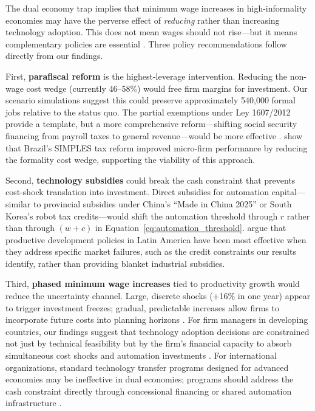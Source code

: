 \documentclass[5p,times,authoryear]{elsarticle}
\begin{document}
The dual economy trap implies that minimum wage increases in high-informality economies may have the perverse effect of \emph{reducing} rather than increasing technology adoption. This does not mean wages should not rise---but it means complementary policies are essential \citep{worldbank2019wdr, ilo2024outlook}. Three policy recommendations follow directly from our findings.

First, \textbf{parafiscal reform} is the highest-leverage intervention. Reducing the non-wage cost wedge (currently 46--58\%) would free firm margins for investment. Our scenario simulations suggest this could preserve approximately 540,000 formal jobs relative to the status quo. The partial exemptions under Ley 1607/2012 provide a template, but a more comprehensive reform---shifting social security financing from payroll taxes to general revenue---would be more effective \citep{levy2008good, pages2010age}. \citet{fajnzylber2011formality} show that Brazil's SIMPLES tax reform improved micro-firm performance by reducing the formality cost wedge, supporting the viability of this approach.

Second, \textbf{technology subsidies} could break the cash constraint that prevents cost-shock translation into investment. Direct subsidies for automation capital---similar to provincial subsidies under China's ``Made in China 2025'' or South Korea's robot tax credits---would shift the automation threshold through $r$ rather than through $(w + c)$ in Equation~\ref{eq:automation_threshold}. \citet{crespi2014rethinking} argue that productive development policies in Latin America have been most effective when they address specific market failures, such as the credit constraints our results identify, rather than providing blanket industrial subsidies.

Third, \textbf{phased minimum wage increases} tied to productivity growth would reduce the uncertainty channel. Large, discrete shocks (+16\% in one year) appear to trigger investment freezes; gradual, predictable increases allow firms to incorporate future costs into planning horizons \citep{aterido2011big}. For firm managers in developing countries, our findings suggest that technology adoption decisions are constrained not just by technical feasibility but by the firm's financial capacity to absorb simultaneous cost shocks and automation investments \citep{hallward2018trouble}. For international organizations, standard technology transfer programs designed for advanced economies may be ineffective in dual economies; programs should address the cash constraint directly through concessional financing or shared automation infrastructure \citep{korinek2021ai, schlogl2020disrupted}.
\end{document}
